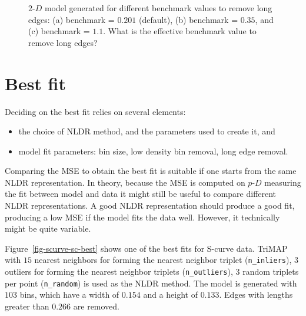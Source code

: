 \documentclass[
  12pt]{article}
\providecommand{\tightlist}{%
  \setlength{\itemsep}{0pt}\setlength{\parskip}{0pt}}\usepackage{longtable,booktabs,array}
\def\tightlist{}
\newcommand\pD{$p\text{-}D$}
\begin{document}
\begin{figure}[H]


\caption{\label{fig-lg-scurve}\(2\text{-}D\) model generated for
different benchmark values to remove long edges: (a) benchmark =
\(0.201\) (default), (b) benchmark = \(0.35\), and (c) benchmark =
\(1.1\). What is the effective benchmark value to remove long edges?}

\end{figure}%

\section{Best fit}\label{best-fit}

Deciding on the best fit relies on several elements:

\begin{itemize}
\tightlist
\item
  the choice of NLDR method, and the parameters used to create it, and
\item
  model fit parameters: bin size, low density bin removal, long edge
  removal.
\end{itemize}

Comparing the MSE to obtain the best fit is suitable if one starts from
the same NLDR representation. In theory, because the MSE is computed on
\pD{} measuring the fit between model and data it might still be useful
to compare different NLDR representations. A good NLDR representation
should produce a good fit, producing a low MSE if the model fits the
data well. However, it technically might be quite variable.

Figure~\ref{fig-scurve-sc-best} shows one of the best fits for S-curve
data. TriMAP with \(15\) nearest neighbors for forming the nearest
neighbor triplet (\texttt{n\_inliers}), \(3\) outliers for forming the
nearest neighbor triplets (\texttt{n\_outliers}), \(3\) random triplets
per point (\texttt{n\_random}) is used as the NLDR method. The model is
generated with \(103\) bins, which have a width of \(0.154\) and a
height of \(0.133\). Edges with lengths greater than \(0.266\) are
removed.
\end{document}
